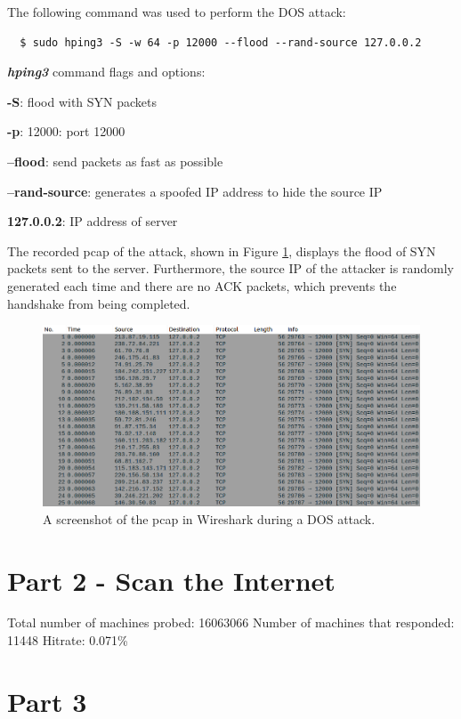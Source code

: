 \documentclass[11pt]{article}
\begin{document}
The following command was used to perform the DOS attack:
\begin{verbatim}
  $ sudo hping3 -S -w 64 -p 12000 --flood --rand-source 127.0.0.2
\end{verbatim}
\textbf{\emph{hping3}} command flags and options:

\textbf{-S}: flood with SYN packets

\textbf{-p}: 12000: port 12000

\textbf{--flood}: send packets as fast as possible

\textbf{--rand-source}: generates a spoofed IP address to hide the source IP

\textbf{127.0.0.2}: IP address of server
\newline

The recorded pcap of the attack, shown in Figure \ref{fig:pcap-screenshot}, displays the flood of SYN packets sent to the server.
Furthermore, the source IP of the attacker is randomly generated each time and there are no ACK packets, which prevents the handshake from being completed.
\begin{figure}[htbp]
\centering
\includegraphics[width=.9\linewidth]{./pcap-screenshot.png}
\caption{\label{fig:pcap-screenshot}
A screenshot of the pcap in Wireshark during a DOS attack.}
\end{figure}

\section{Part 2 - Scan the Internet}
\label{sec:part-2}

Total number of machines probed: 16063066
Number of machines that responded: 11448
Hitrate: 0.071\%

\section{Part 3}
\end{document}
